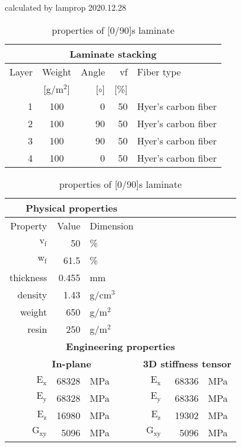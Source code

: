\begin{table}[!htbp]
  \renewcommand{\arraystretch}{1.2}
  \caption{\label{tab:[0/90]s laminate}properties of [0/90]s laminate}
  \centering\footnotesize{\rule{0pt}{10pt}
  \tiny calculated by lamprop 2020.12.28\\[3pt]}
    \begin{tabular}[t]{rcrrl}
      \multicolumn{5}{c}{\small\textbf{Laminate stacking}}\\[0.1em]
      \toprule %
      Layer & Weight & Angle & vf & Fiber type\\
            & [g/m$^2$] & [$\circ$] & [\%]\\
      \midrule
      1 &  100 &     0 & 50 & Hyer's carbon fiber\\
      2 &  100 &    90 & 50 & Hyer's carbon fiber\\
      3 &  100 &    90 & 50 & Hyer's carbon fiber\\
      4 &  100 &     0 & 50 & Hyer's carbon fiber\\
      \bottomrule
    \end{tabular}\hspace{0.02\textwidth}
    \begin{tabular}[t]{rrlrrl}
      \multicolumn{3}{c}{\small\textbf{Physical properties}}\\[0.1em]
      \toprule
      Property & Value & Dimension\\
      \midrule
      $\mathrm{v_f}$ & 50 &\%\\
      $\mathrm{w_f}$ & 61.5 &\%\\
      thickness & 0.455 & mm\\
      density & 1.43 & g/cm$^3$\\
      weight & 650 & g/m$^2$\\
      resin & 250 & g/m$^2$\\
      \midrule
      \multicolumn{6}{c}{\small\textbf{Engineering properties}}\\[0.1em]
      \multicolumn{3}{c}{\small\textbf{In-plane}} & 
\multicolumn{3}{c}{\small\textbf{3D stiffness tensor}}\\[0.1em]
      $\mathrm{E_x}$ &    68328 & MPa & $\mathrm{E_x}$ &    68336 & MPa\\
      $\mathrm{E_y}$ &    68328 & MPa & $\mathrm{E_y}$ &    68336 & MPa\\
      $\mathrm{E_z}$ &    16980 & MPa & $\mathrm{E_z}$ &    19302 & MPa\\
      $\mathrm{G_{xy}}$ &     5096 & MPa & $\mathrm{G_{xy}}$ &     5096 & MPa\\

\end{tabular}
\end{table}

